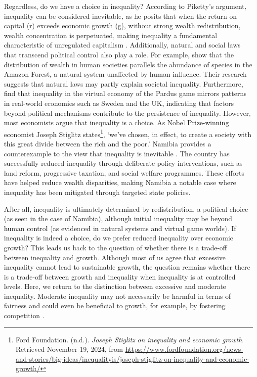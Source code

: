 Regardless, do we have a choice in inequality? According to Piketty’s argument, inequality can be considered inevitable, as he posits that when the return on capital (r) exceeds economic growth (g), without strong wealth redistribution, wealth concentration is perpetuated, making inequality a fundamental characteristic of unregulated capitalism \parencite{piketty2014capital}. Additionally, natural and social laws that transcend political control also play a role. For example, \textcite{scheffer2017inequality} show that the distribution of wealth in human societies parallels the abundance of species in the Amazon Forest, a natural system unaffected by human influence. Their research suggests that natural laws may partly explain societal inequality. Furthermore, \textcite{fuchs2014behavioral} find that inequality in the virtual economy of the Pardus game mirrors patterns in real-world economies such as Sweden and the UK, indicating that factors beyond political mechanisms contribute to the persistence of inequality. However, most economists argue that inequality is a choice. As Nobel Prize-winning economist Joseph Stiglitz states\footnote{Ford Foundation. (n.d.). \textit{Joseph Stiglitz on inequality and economic growth}. Retrieved November 19, 2024, from \href{https://www.fordfoundation.org/news-and-stories/big-ideas/inequalityis/joseph-stiglitz-on-inequality-and-economic-growth/}{https://www.fordfoundation.org/news-and-stories/big-ideas/inequalityis/joseph-stiglitz-on-inequality-and-economic-growth/} }, `we’ve chosen, in effect, to create a society with this great divide between the rich and the poor.' Namibia provides a counterexample to the view that inequality is inevitable \parencite{lawson2017inequality}. The country has successfully reduced inequality through deliberate policy interventions, such as land reform, progressive taxation, and social welfare programmes. These efforts have helped reduce wealth disparities, making Namibia a notable case where inequality has been mitigated through targeted state policies.

After all, inequality is ultimately determined by redistribution, a political choice (as seen in the case of Namibia), although initial inequality may be beyond human control (as evidenced in natural systems and virtual game worlds). If inequality is indeed a choice, do we prefer reduced inequality over economic growth? This leads us back to the question of whether there is a trade-off between inequality and growth. Although most of us agree that excessive inequality cannot lead to sustainable growth, the question remains whether there is a trade-off between growth and inequality when inequality is at controlled levels. Here, we return to the distinction between excessive and moderate inequality. Moderate inequality may not necessarily be harmful in terms of fairness \parencite{ku2013procedural} and could even be beneficial to growth, for example, by fostering competition \parencite{ferreira2022impact}. 

